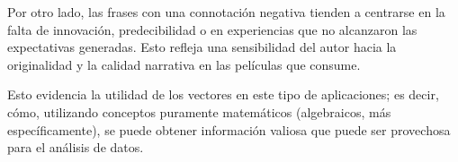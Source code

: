 \documentclass{article}
\begin{document}
    Por otro lado, las frases con una connotación negativa tienden a centrarse en la falta de innovación, predecibilidad o en experiencias que no alcanzaron las expectativas generadas. Esto refleja una sensibilidad del autor hacia la originalidad y la calidad narrativa en las películas que consume.

    Esto evidencia la utilidad de los vectores en este tipo de aplicaciones; es decir, cómo, utilizando conceptos puramente matemáticos (algebraicos, más específicamente), se puede obtener información valiosa que puede ser provechosa para el análisis de datos.
\end{document}
